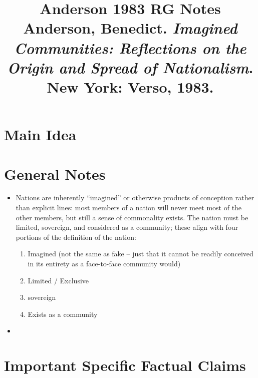 \documentclass[12pt]{article}
\title{\textbf{Anderson 1983 RG Notes}\\
\large Anderson, Benedict. \textit{Imagined Communities: Reflections on the Origin and Spread of Nationalism}.\\
New York: Verso, 1983.}
\author{}
\date{}
\begin{document}
\maketitle

\section{Main Idea}



\section{General Notes}

\begin{itemize}[leftmargin=*, itemsep=4pt]
    \item Nations are inherently ``imagined'' or otherwise products of conception rather than explicit lines: most members of a nation will never meet most of the other members, but still a sense of commonality exists. The nation must be limited, sovereign, and considered as a community; these align with four portions of the definition of the nation:
    \begin{enumerate}
        \item Imagined (not the same as fake -- just that it cannot be readily conceived in its entirety as a face-to-face community would)
        \item Limited / Exclusive
        \item sovereign
        \item Exists as a community
    \end{enumerate}
    \item
\end{itemize}


\section{Important Specific Factual Claims}
\end{document}
